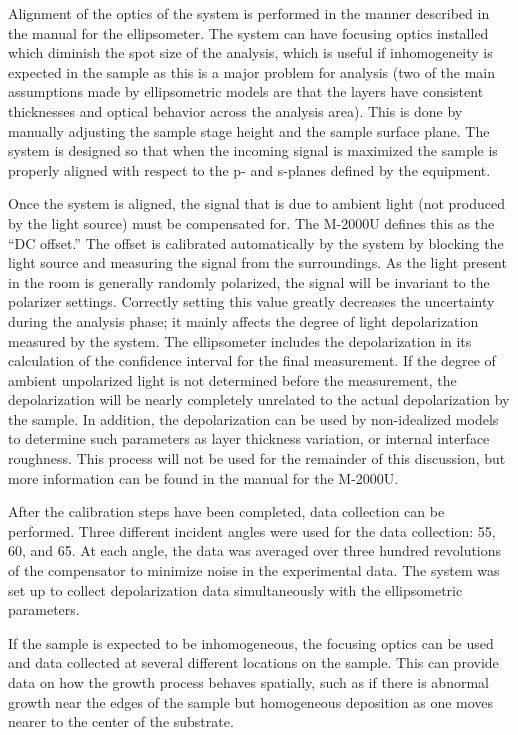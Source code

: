 Alignment of the optics of the system is performed in the manner described in the manual for the ellipsometer.\cite{WVASE-manual} The system can have focusing optics installed which diminish the spot size of the analysis, which is useful if inhomogeneity is expected in the sample as this is a major problem for analysis (two of the main assumptions made by ellipsometric models are that the layers have consistent thicknesses and optical behavior across the analysis area). This is done by manually adjusting the sample stage height and the sample surface plane. The system is designed so that when the incoming signal is maximized the sample is properly aligned with respect to the p- and s-planes defined by the equipment. 

Once the system is aligned, the signal that is due to ambient light (not produced by the light source) must be compensated for. The M-2000U defines this as the ``DC offset.''\cite{WVASE-manual} The offset is calibrated automatically by the system by blocking the light source and measuring the signal from the surroundings. As the light present in the room is generally randomly polarized, the signal will be invariant to the polarizer settings. Correctly setting this value greatly decreases the uncertainty during the analysis phase; it mainly affects the degree of light depolarization measured by the system. The ellipsometer includes the depolarization in its calculation of the confidence interval for the final measurement. If the degree of ambient unpolarized light is not determined before the measurement, the depolarization will be nearly completely unrelated to the actual depolarization by the sample. In addition, the depolarization can be used by non-idealized models to determine such parameters as layer thickness variation, or internal interface roughness. This process will not be used for the remainder of this discussion, but more information can be found in the manual for the M-2000U.\cite{WVASE-manual} 

After the calibration steps have been completed, data collection can be performed. Three different incident angles were used for the data collection: 55\Deg{}, 60\Deg{}, and 65\Deg{}. At each angle, the data was averaged over three hundred revolutions of the compensator to minimize noise in the experimental data. The system was set up to collect depolarization data simultaneously with the ellipsometric parameters.\cite{WVASE-manual} 

If the sample is expected to be inhomogeneous, the focusing optics can be used and data collected at several different locations on the sample. This can provide data on how the growth process behaves spatially, such as if there is abnormal growth near the edges of the sample but homogeneous deposition as one moves nearer to the center of the substrate. 

